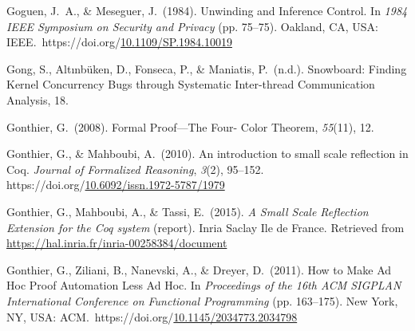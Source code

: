 \documentclass[12pt,twoside]{article}
\begin{document}
{\begin{thebibliography}{1079}
\mdbibitemlabel{}Goguen, J.~A., \& Meseguer, J.~(1984). Unwinding and Inference Control. In \emph{1984 IEEE Symposium on Security and Privacy} (pp. 75–75). Oakland, CA, USA: IEEE.~https://doi.org/\href{https://dx.doi.org/10.1109/SP.1984.10019}{10.1109/SP.1984.10019}%

\mdbibitemlabel{}Gong, S., Altınbüken, D., Fonseca, P., \& Maniatis, P.~(n.d.). Snowboard: Finding Kernel Concurrency Bugs through Systematic Inter-thread Communication Analysis, 18.%

\mdbibitemlabel{}Gonthier, G.~(2008). Formal Proof—The Four- Color Theorem, \emph{55}(11), 12.%

\mdbibitemlabel{}Gonthier, G., \& Mahboubi, A.~(2010). An introduction to small scale reflection in Coq. \emph{Journal of Formalized Reasoning}, \emph{3}(2), 95–152. https://doi.org/\href{https://dx.doi.org/10.6092/issn.1972-5787/1979}{10.6092/issn.1972-5787/1979}%

\mdbibitemlabel{}Gonthier, G., Mahboubi, A., \& Tassi, E.~(2015). \emph{A Small Scale Reflection Extension for the Coq system} (report). Inria Saclay Ile de France. Retrieved from \href{https://hal.inria.fr/inria-00258384/document}{{\ttfamily https://\hspace{0pt}hal.\hspace{0pt}inria.\hspace{0pt}fr/\hspace{0pt}inria-\hspace{0pt}00258384/\hspace{0pt}document}}%

\mdbibitemlabel{}Gonthier, G., Ziliani, B., Nanevski, A., \& Dreyer, D.~(2011). How to Make Ad Hoc Proof Automation Less Ad Hoc. In \emph{Proceedings of the 16th ACM SIGPLAN International Conference on Functional Programming} (pp. 163–175). New York, NY, USA: ACM.~https://doi.org/\href{https://dx.doi.org/10.1145/2034773.2034798}{10.1145/2034773.2034798}%


\end{thebibliography}}
\end{document}
